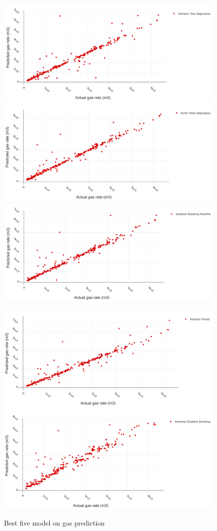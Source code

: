 \documentclass[12pt,a4paper]{report}
\begin{document}
\begin{figure}[H]
\centering
\includegraphics[width=.3\textwidth]{5best_gas/DCT}\quad
\includegraphics[width=.3\textwidth]{5best_gas/ETT}\quad
\includegraphics[width=.3\textwidth]{5best_gas/GBM}

\medskip

\includegraphics[width=.3\textwidth]{5best_gas/RF}\quad
\includegraphics[width=.3\textwidth]{5best_gas/XGB}

\caption{Best five model on gas prediction}
\label{pics:blablabla}
\end{figure}
\end{document}
